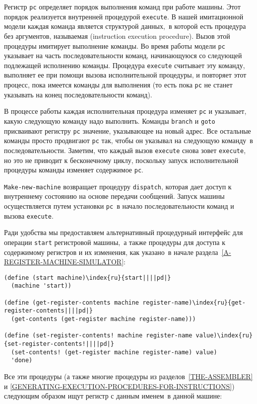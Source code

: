 Регистр {\tt pc} определяет порядок выполнения
команд при работе машины.  Этот порядок реализуется внутренней
процедурой {\tt execute}.  В нашей имитационной модели каждая
команда является структурой данных,~в которой есть процедура без
аргументов, называемая  
 (instruction execution procedure).  Вызов этой процедуры имитирует выполнение команды. Во
время работы модели {\tt pc} указывает на часть
последовательности команд, начинающуюся со следующей 
подлежащей исполнению команды. Процедура {\tt execute}
считывает эту
команду, выполняет ее при помощи вызова исполнительной процедуры, и
повторяет этот процесс, пока имеется команды для выполнения (то есть
пока {\tt pc} не станет указывать на конец последовательности
команд).

В процессе работы каждая исполнительная процедура
изменяет {\tt pc} и указывает, какую следующую команду надо
выполнить.  Команды {\tt branch} и {\tt goto}
присваивают регистру {\tt pc} значение, указывающее на новый
адрес.  Все остальные команды просто продвигают {\tt pc} так,
чтобы он указывал на следующую команду~в последовательности.  Заметим,
что каждый вызов {\tt execute} снова зовет
{\tt execute}, но это не приводит к бесконечному циклу,
поскольку запуск исполнительной процедуры команды изменяет содержимое
{\tt pc}.

{\tt Make-new-machine} возвращает процедуру
{\tt dispatch}, которая дает доступ к внутреннему состоянию на
основе передачи сообщений.  Запуск машины осуществляется
путем установки {\tt pc}~в начало последовательности команд и
вызова {\tt execute}.

Ради удобства мы предоставляем альтернативный процедурный
интерфейс для операции {\tt start} регистровой машины,~а также
процедуры для доступа к содержимому регистров и их изменения, как
указано~в начале 
раздела~\ref{A-REGISTER-MACHINE-SIMULATOR}:

\begin{Verbatim}[fontsize=\small]
(define (start machine)\index{ru}{start||||pd|}
  (machine 'start))

(define (get-register-contents machine register-name)\index{ru}{get-register-contents||||pd|}
  (get-contents (get-register machine register-name)))

(define (set-register-contents! machine register-name value)\index{ru}{set-register-contents!||||pd|}
  (set-contents! (get-register machine register-name) value)
  'done)
\end{Verbatim}
Все эти процедуры (а также многие процедуры из 
разделов~\ref{THE-ASSEMBLER} и 
\ref{GENERATING-EXECUTION-PROCEDURES-FOR-INSTRUCTIONS})
следующим образом ищут регистр с данным именем~в данной машине:

